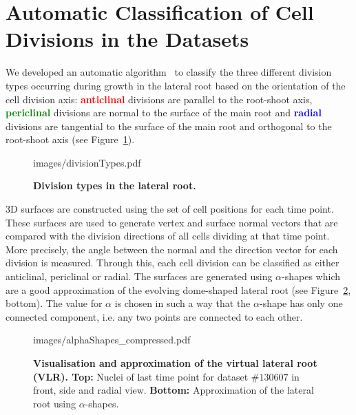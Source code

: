 \documentclass[11pt,a4paper, final]{article}
\begin{document}
\section{Automatic Classification of Cell Divisions in the Datasets}
\label{sec:divisionTypes}
\noindent
We developed an automatic algorithm~\cite[chapter 4]{FangerauDiss_2015} to classify the three different division types occurring during growth in the lateral root based on the orientation of the cell division axis: \textcolor{red}{\textbf{anticlinal}} divisions are parallel to the root-shoot axis, \textcolor{green}{\textbf{periclinal}} divisions are normal to the surface of the main root and \textcolor{blue}{\textbf{radial}} divisions are tangential to the surface of the main root and orthogonal to the root-shoot axis (see Figure~\ref{fig:divisionTypes}).
%
\begin{figure}[htbp]
	\begin{center}
		\begin{overpic}[width=0.8\linewidth]{images/divisionTypes.pdf}
		\end{overpic}
\caption[]
{
{\bf Division types in the lateral root.}
}
	\label{fig:divisionTypes}
	\end{center}
\end{figure}
%
3D surfaces are constructed using the set of cell positions for each time point. These surfaces are used to generate vertex and surface normal vectors that are compared with the division directions of all cells dividing at that time point. More precisely, the angle between the normal and the direction vector for each division is measured. Through this, each cell division can be classified as either anticlinal, periclinal or radial. The surfaces are generated using $\alpha$-shapes which are a good approximation of the evolving dome-shaped lateral root (see Figure~\ref{fig:alphaShapes}, bottom). The value for $\alpha$ is chosen in such a way that the $\alpha$-shape has only one connected component, i.e. any two points are connected to each other.
%
\begin{figure}[htbp]
	\begin{center}
		\begin{overpic}[width=1.\linewidth]{images/alphaShapes_compressed.pdf}
		\end{overpic}
\caption[]
{
{\bf Visualisation and approximation of the virtual lateral root (VLR). Top:} Nuclei of last time point for dataset $\# 130607$ in front, side and radial view. {\bf Bottom:} Approximation of the lateral root using $\alpha$-shapes.
}
	\label{fig:alphaShapes}
	\end{center}
\end{figure}
\end{document}
